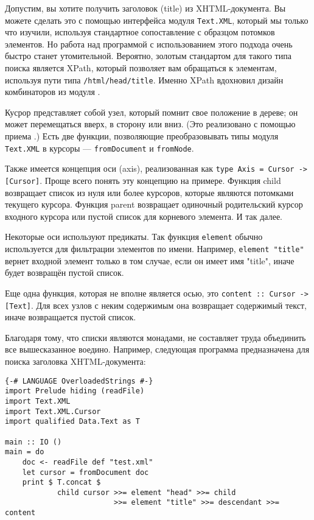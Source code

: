 Допустим, вы хотите получить заголовок (title) из XHTML-документа. Вы можете сделать это с помощью интерфейса модуля \lstinline!Text.XML!, который мы только что изучили, используя стандартное сопоставление с образцом потомков элементов. Но работа над программой с использованием этого подхода очень быстро станет утомительной. Вероятно, золотым стандартом для такого типа поиска является XPath, который позволяет вам обращаться к элементам, используя пути типа \lstinline!/html/head/title!. Именно XPath вдохновил дизайн комбинаторов из модуля .

Кусрор представляет собой узел, который помнит свое положение в дереве; он может перемещаться вверх, в сторону или вниз. (Это реализовано с помощью приема .) Есть две функции, позволяющие преобразовывать типы модуля \lstinline!Text.XML! в курсоры --- \lstinline!fromDocument! и \lstinline!fromNode!.

Также имеется концепция оси (axis), реализованная как \lstinline!type Axis = Cursor -> [Cursor]!. Проще всего понять эту концепцию на примере. Функция child возвращает список из нуля или более курсоров, которые являются потомками текущего курсора. Функция parent возвращает одиночный родительский курсор входного курсора или пустой список для корневого элемента. И так далее.

Некоторые оси используют предикаты. Так функция \lstinline!element! обычно используется для фильтрации элементов по имени. Например, \lstinline!element "title"! вернет входной элемент только в том случае, если он имеет имя "title", иначе будет возвращён пустой список.

Еще одна функция, которая не вполне является осью, это \lstinline!content :: Cursor -> [Text]!. Для всех узлов с неким содержимым она возвращает содержимый текст, иначе возвращается пустой список.

Благодаря тому, что списки являются монадами, не составляет труда объединить все вышесказанное воедино. Например, следующая программа предназначена для поиска заголовка XHTML-документа:

\begin{lstlisting}
{-# LANGUAGE OverloadedStrings #-}
import Prelude hiding (readFile)
import Text.XML
import Text.XML.Cursor
import qualified Data.Text as T

main :: IO ()
main = do
    doc <- readFile def "test.xml"
    let cursor = fromDocument doc
    print $ T.concat $
            child cursor >>= element "head" >>= child
                         >>= element "title" >>= descendant >>= content
\end{lstlisting}

